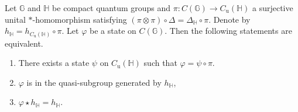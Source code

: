 \documentclass[10pt,a4paper]{amsart}
\begin{document}
\begin{proposition}
  Let $\mathbb{G}$ and $\mathbb{H}$ be compact quantum groups and $\pi : C(\mathbb{G}) \to C_{\text{u}}(\mathbb{H})$ a surjective unital $*$-homomorphism satisfying $(\pi \otimes \pi) \circ \Delta = \Delta_{\mathbb{H}} \circ \pi$.  Denote by $h_{\mathbb{H}} = h_{C_{\text{u}}(\mathbb{H})} \circ \pi$. Let $\varphi$ be a state on $C(\mathbb{G})$. Then the following statements are equivalent.
\begin{enumerate}
\item[(i)] There exists a state $\psi$ on $C_{\text{u}}(\mathbb{H})$ such that $\varphi = \psi \circ \pi$.
\item[(ii)] $\varphi$ is in the quasi-subgroup generated by $h_{\mathbb{H}}$,
\item[(iii)] $\varphi \star h_{\mathbb{H}}=h_{\mathbb{H}}$.
\end{enumerate}
\end{proposition}
\end{document}

